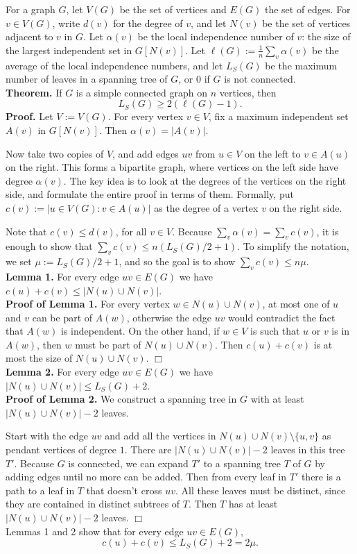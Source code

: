 
For a graph $G$, let $V(G)$ be the set of vertices and $E(G)$ the set of edges. For $v \in V(G)$, write $d(v)$ for the degree of $v$, and let $N(v)$ be the set of vertices adjacent to $v$ in $G$. Let $\alpha(v)$ be the local independence number of $v$: the size of the largest independent set in $G[N(v)]$. Let $\ell(G) := \frac{1}{n}\sum_v \alpha(v)$ be the average of the local independence numbers, and let $L_S(G)$ be the maximum number of leaves in a spanning tree of $G$, or $0$ if $G$ is not connected.
\\
\textbf{Theorem.}
If $G$ is a simple connected graph on $n$ vertices, then
$$L_S(G) \geq 2(\ell(G) - 1).$$
\textbf{Proof.}
Let $V := V(G)$. For every vertex $v \in V$, fix a maximum independent set $A(v)$ in $G[N(v)]$. Then $\alpha(v) = |A(v)|$.

Now take two copies of $V$, and add edges $uv$ from $u \in V$ on the left to $v \in A(u)$ on the right. This forms a bipartite graph, where vertices on the left side have degree $\alpha(v)$. The key idea is to look at the degrees of the vertices on the right side, and formulate the entire proof in terms of them. Formally, put $c(v) := |{u \in V(G): v \in A(u)|}$ as the degree of a vertex $v$ on the right side.

Note that $c(v) \leq d(v)$, for all $v \in V$. Because $\sum_v \alpha(v) = \sum_v c(v)$, it is enough to show that $\sum_v c(v) \leq n(L_S(G)/ 2 + 1)$. To simplify the notation, we set $\mu := L_S(G)/ 2 + 1$, and so the goal is to show $\sum_v c(v) \leq n\mu$.
\\
\textbf{Lemma 1.}
For every edge $uv \in E(G)$ we have $c(u) + c(v) \leq |N(u) \cup N(v)|$.
\\
\textbf{Proof of Lemma 1.} For every vertex $w \in N(u) \cup N(v)$, at most one of $u$ and $v$ can be part of $A(w)$, otherwise the edge $uv$ would contradict the fact that $A(w)$ is independent. On the other hand, if $w \in V$ is such that $u$ or $v$ is in $A(w)$, then $w$ must be part of $N(u) \cup N(v)$. Then $c(u) + c(v)$ is at most the size of $N(u) \cup N(v)$. $\Box$
\\
\textbf{Lemma 2.}
For every edge $uv \in E(G)$ we have $|N(u) \cup N(v)| \leq L_S(G) + 2$.
\\
\textbf{Proof of Lemma 2.} We construct a spanning tree in $G$ with at least $|N(u) \cup N(v)| - 2$ leaves.

Start with the edge $uv$ and add all the vertices in $N(u) \cup N(v) \setminus \{u,v\}$ as pendant vertices of degree $1$. There are $|N(u) \cup N(v)| - 2$ leaves in this tree $T'$. Because $G$ is connected, we can expand $T'$ to a spanning tree $T$ of $G$ by adding edges until no more can be added. Then from every leaf in $T'$ there is a path to a leaf in $T$ that doesn't cross $uv$. All these leaves must be distinct, since they are contained in distinct subtrees of $T$. Then $T$ has at least $|N(u) \cup N(v)| - 2$ leaves. $\Box$
\\
Lemmas 1 and 2 show that for every edge $uv \in E(G)$,
$$c(u) + c(v) \leq L_S(G) + 2 = 2\mu.$$

